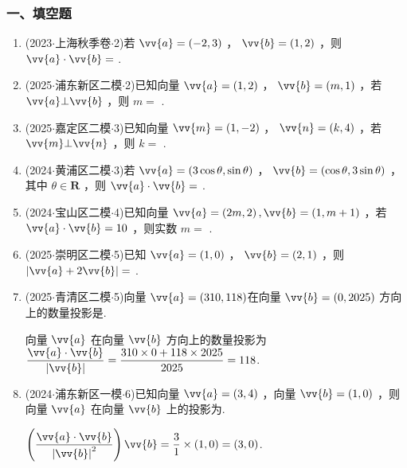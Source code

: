 \subsubsection*{一、填空题}
\begin{enumerate}
    \item (2023$\cdot$上海秋季卷$\cdot$2)若 $\vv{a} = \left( {-2,3}\right)$ ， $\vv{b} = \left( {1,2}\right)$ ，则 $\vv{a} \cdot  \vv{b} =$ .

    \item (2025$\cdot$浦东新区二模$\cdot$2)已知向量 $\vv{a} = \left( {1,2}\right)$ ， $\vv{b} = \left( {m,1}\right)$ ，若 $\vv{a}\bot \vv{b}$ ，则 $m =$ .

    \item (2025$\cdot$嘉定区二模$\cdot$3)已知向量 $\vv{m} = \left( {1, - 2}\right)$ ， $\vv{n} = \left( {k,4}\right)$ ，若 $\vv{m}\bot \vv{n}$ ，则 $k =$ .

    \item (2024$\cdot$黄浦区二模$\cdot$3)若 $\vv{a} = \left( {3\cos \theta ,\sin \theta }\right)$ ， $\vv{b} = \left( {\cos \theta ,3\sin \theta }\right)$ ，其中 $\theta  \in  \mathbf{R}$ ，则 $\vv{a} \cdot  \vv{b} =$ .

    \item (2024$\cdot$宝山区二模$\cdot$4)已知向量 $\vv{a} = \left( {{2m},2}\right) ,\vv{b} = \left( {1,m + 1}\right)$ ，若 $\vv{a} \cdot  \vv{b} = {10}$ ，则实数 $m =$ .

    \item (2025$\cdot$崇明区二模$\cdot$5)已知 $\vv{a} = \left( {1,0}\right)$ ， $\vv{b} = \left( {2,1}\right)$ ，则 $\left| {\vv{a} + 2\vv{b}}\right|  =$ .

    \item (2025$\cdot$青清区二模$\cdot$5)向量 $\vv{a} = (310, 118)$在向量 $\vv{b} = \left( {0,{2025}}\right)$ 方向上的数量投影是.
    \begin{jieda}
        向量 $\vv{a}$ 在向量 $\vv{b}$ 方向上的数量投影为 $\dfrac{\vv{a} \cdot  \vv{b}}{\left| \vv{b}\right| } = \dfrac{{310} \times  0 + {118} \times  {2025}}{2025} = {118}$.
    \end{jieda}

    \item (2024$\cdot$浦东新区一模$\cdot$6)已知向量 $\vv{a} = \left( {3,4}\right)$ ，向量 $\vv{b} = \left( {1,0}\right)$ ，则向量 $\vv{a}$ 在向量 $\vv{b}$ 上的投影为.
    \begin{jieda}
        $\left( \dfrac{\vv{a} \cdot  \vv{b}}{{\left| \vv{b}\right| }^{2}}\right) \vv{b} = \dfrac{3}{1} \times  \left( {1,0}\right)  = \left( {3,0}\right)$.
    \end{jieda}


\end{enumerate}

